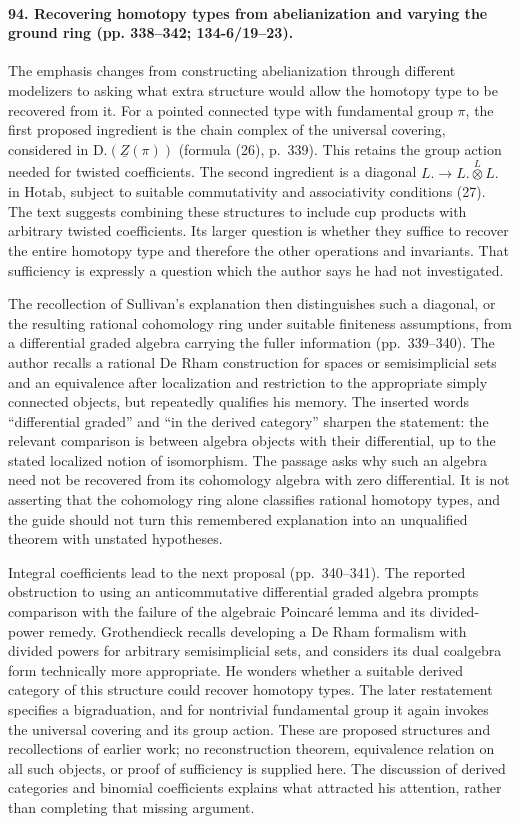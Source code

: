 \paragraph{94. Recovering homotopy types from abelianization and varying the ground ring (pp. 338--342; 134-6/19--23).}
The emphasis changes from constructing abelianization through different modelizers to asking what extra structure would allow the homotopy type to be recovered from it. For a pointed connected type with fundamental group $\pi$, the first proposed ingredient is the chain complex of the universal covering, considered in $\mathrm{D.}(\underline Z(\pi))$ (formula (26), p.~339). This retains the group action needed for twisted coefficients. The second ingredient is a diagonal $L.\to L.\overset{L}{\otimes}L.$ in $\mathrm{Hotab}$, subject to suitable commutativity and associativity conditions (27). The text suggests combining these structures to include cup products with arbitrary twisted coefficients. Its larger question is whether they suffice to recover the entire homotopy type and therefore the other operations and invariants. That sufficiency is expressly a question which the author says he had not investigated.

The recollection of Sullivan's explanation then distinguishes such a diagonal, or the resulting rational cohomology ring under suitable finiteness assumptions, from a differential graded algebra carrying the fuller information (pp.~339--340). The author recalls a rational De Rham construction for spaces or semisimplicial sets and an equivalence after localization and restriction to the appropriate simply connected objects, but repeatedly qualifies his memory. The inserted words ``differential graded'' and ``in the derived category'' sharpen the statement: the relevant comparison is between algebra objects with their differential, up to the stated localized notion of isomorphism. The passage asks why such an algebra need not be recovered from its cohomology algebra with zero differential. It is not asserting that the cohomology ring alone classifies rational homotopy types, and the guide should not turn this remembered explanation into an unqualified theorem with unstated hypotheses.

Integral coefficients lead to the next proposal (pp.~340--341). The reported obstruction to using an anticommutative differential graded algebra prompts comparison with the failure of the algebraic Poincar\'e lemma and its divided-power remedy. Grothendieck recalls developing a De Rham formalism with divided powers for arbitrary semisimplicial sets, and considers its dual coalgebra form technically more appropriate. He wonders whether a suitable derived category of this structure could recover homotopy types. The later restatement specifies a bigraduation, and for nontrivial fundamental group it again invokes the universal covering and its group action. These are proposed structures and recollections of earlier work; no reconstruction theorem, equivalence relation on all such objects, or proof of sufficiency is supplied here. The discussion of derived categories and binomial coefficients explains what attracted his attention, rather than completing that missing argument.

